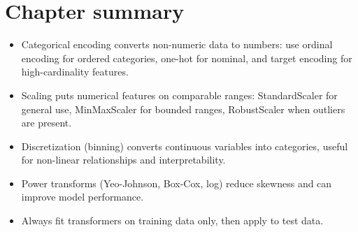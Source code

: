 \section{Chapter summary}

\begin{itemize}
  \item Categorical encoding converts non-numeric data to numbers: use ordinal encoding for ordered categories, one-hot for nominal, and target encoding for high-cardinality features.
  \item Scaling puts numerical features on comparable ranges: StandardScaler for general use, MinMaxScaler for bounded ranges, RobustScaler when outliers are present.
  \item Discretization (binning) converts continuous variables into categories, useful for non-linear relationships and interpretability.
  \item Power transforms (Yeo-Johnson, Box-Cox, log) reduce skewness and can improve model performance.
  \item Always fit transformers on training data only, then apply to test data.
\end{itemize}

